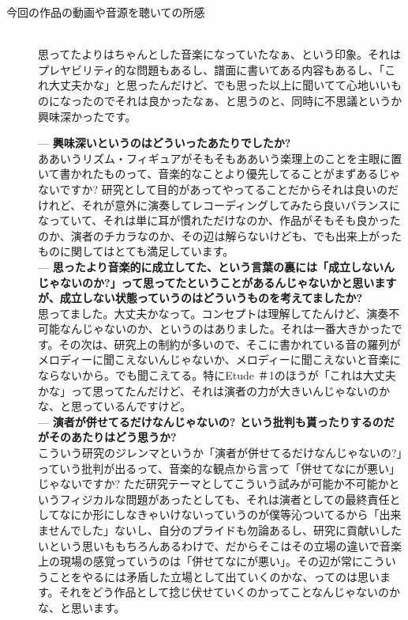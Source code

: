 \documentclass[uplatex,dvipdfmx]{ujarticle}
\begin{document}
\begin{description}
\item[今回の作品の動画や音源を聴いての所感]\mbox{}\\

思ってたよりはちゃんとした音楽になっていたなぁ、という印象。それはプレヤビリティ的な問題もあるし、譜面に書いてある内容もあるし、「これ大丈夫かな」と思ったんだけど、でも思った以上に聞いてて心地いいものになったのでそれは良かったなぁ、と思うのと、同時に不思議というか興味深かったです。

--- {\bf 興味深いというのはどういったあたりでしたか?}\\

ああいうリズム・フィギュアがそもそもああいう楽理上のことを主眼に置いて書かれたものって、音楽的なことより優先してることがまずあるじゃないですか? 研究として目的があってやってることだからそれは良いのだけれど、それが意外に演奏してレコーディングしてみたら良いバランスになっていて、それは単に耳が慣れただけなのか、作品がそもそも良かったのか、演者のチカラなのか、その辺は解らないけども、でも出来上がったものに関してはとても満足しています。\\

--- {\bf 思ったより音楽的に成立してた、という言葉の裏には「成立しないんじゃないのか?」って思ってたということがあるんじゃないかと思いますが、成立しない状態っていうのはどういうものを考えてましたか?}\\

思ってました。大丈夫かなって。コンセプトは理解してたんけど、演奏不可能なんじゃないのか、というのはありました。それは一番大きかったです。その次は、研究上の制約が多いので、そこに書かれている音の羅列がメロディーに聞こえないんじゃないか、メロディーに聞こえないと音楽にならないから。でも聞こえてる。特にEtude ＃1のほうが「これは大丈夫かな」って思ってたんだけど、それは演者の力が大きいんじゃないのかな、と思っているんですけど。\\

--- {\bf 演者が併せてるだけなんじゃないの? という批判も貰ったりするのだがそのあたりはどう思うか?}\\

こういう研究のジレンマというか「演者が併せてるだけなんじゃないの?」っていう批判が出るって、音楽的な観点から言って「併せてなにが悪い」じゃないですか? ただ研究テーマとしてこういう試みが可能か不可能かというフィジカルな問題があったとしても、それは演者としての最終責任としてなにか形にしなきゃいけないっていうのが僕等沁ついてるから「出来ませんでした」ないし、自分のプライドも勿論あるし、研究に貢献いしたいという思いももちろんあるわけで、だからそこはその立場の違いで音楽上の現場の感覚っていうのは「併せてなにが悪い」。その辺が常にこういうことをやるには矛盾した立場として出ていくのかな、ってのは思います。それをどう作品として捻じ伏せていくのかってことなんじゃないのかな、と思います。\\


\end{description}
\end{document}
